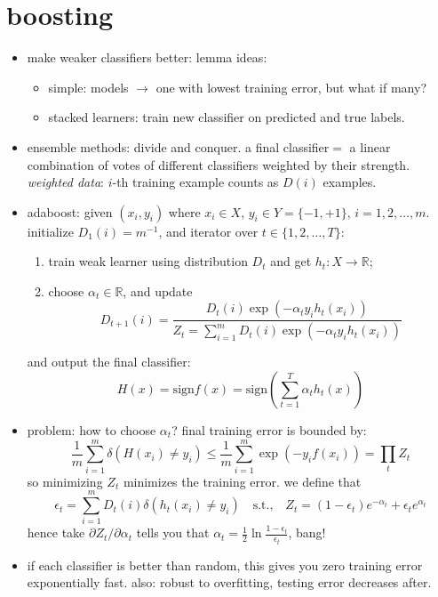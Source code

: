 \documentclass{article}
\begin{document}
\section{boosting}
\begin{itemize}
	\item make weaker classifiers better: lemma ideas: 
		\begin{itemize}
			\item simple: models $\rightarrow$ one with lowest training error, but what if many?
			\item stacked learners: train new classifier on predicted and true labels.
		\end{itemize}
	\item ensemble methods: divide and conquer. a final classifier${}={}$ a linear 
		combination of votes of different classifiers weighted by their strength. \\
		{\it weighted data}: $i$-th training example counts as $D(i)$ examples.
	\item adaboost: given $(x_i,y_i)$ where $x_i\in X$, $y_i\in Y=\{-1,+1\}$, $i=1,2,\dots,m$.
		initialize $D_1(i)=m^{-1}$, and iterator over $t\in\{1,2,\dots,T\}$: 
		\begin{enumerate}
			\item train weak learner using distribution $D_t$ and get $h_t:X\rightarrow\mathbb{R}$;
			\item choose $\alpha_t\in\mathbb{R}$, and update 
			\begin{equation}
				D_{t+1}(i)=\frac{D_t(i)\exp(-\alpha_ty_ih_t(x_i))}
					{Z_t=\sum_{i=1}^mD_t(i)\exp(-\alpha_ty_ih_t(x_i))}
			\end{equation}
		\end{enumerate}
		and output the final classifier: 
		\begin{equation}
			H(x)=\text{sign}f(x)=\text{sign}\left(\sum_{t=1}^T\alpha_th_t(x)\right)
		\end{equation}
	\item problem: how to choose $\alpha_t$? final training error is bounded by: 
		\begin{equation}
			\frac1m\sum_{i=1}^m\delta(H(x_i)\ne y_i)\le\frac1m
				\sum_{i=1}^m\exp(-y_if(x_i))=\prod_tZ_t
		\end{equation}
		so minimizing $Z_t$ minimizes the training error. we define that 
		\begin{equation}
			\epsilon_t=\sum_{i=1}^mD_t(i)\delta(h_t(x_i)\ne y_i)\quad\text{s.t.,}
			\quad Z_t=(1-\epsilon_t)e^{-\alpha_t}+\epsilon_te^{\alpha_t}
		\end{equation}
		hence take $\partial Z_t/\partial\alpha_t$ tells you that 
			$\alpha_t=\frac12\ln\frac{1-\epsilon_t}{\epsilon_t}$, bang!
	\item if each classifier is better than random, this gives you zero training error
		exponentially fast. also: robust to overfitting, testing error decreases after.
\end{itemize}


	
\end{document}

